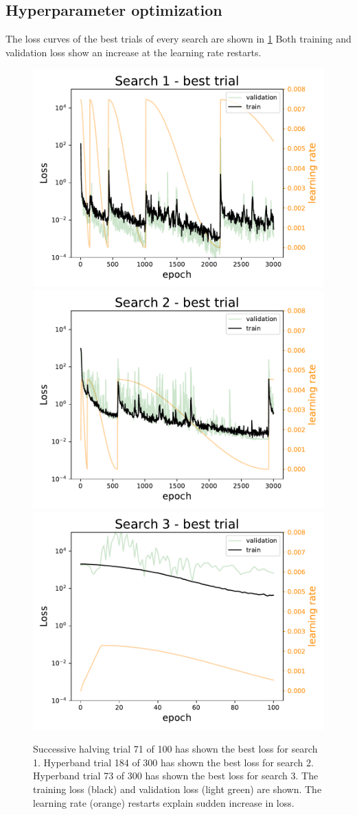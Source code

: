 
\subsection{Hyperparameter optimization}

The loss curves of the best trials of every search are shown in \cref{fig:skinstression-search-best-loss}
Both training and validation loss show an increase at the learning rate restarts.

\begin{figure}
    \centering
    \includegraphics[width=0.33\linewidth]{skinstression/images/hyperparameter-search/search-1/best-trial-loss.pdf}
    \includegraphics[width=0.33\linewidth]{skinstression/images/hyperparameter-search/search-2/best-trial-loss.pdf}
    \includegraphics[width=0.33\linewidth]{skinstression/images/hyperparameter-search/search-3/best-trial-loss.pdf}
    \caption[Hyperparameter search the best losses]{
        Successive halving trial 71 of 100 has shown the best loss for search 1.
        Hyperband trial 184 of 300 has shown the best loss for search 2.
        Hyperband trial 73 of 300 has shown the best loss for search 3.
        The training loss (black) and validation loss (light green) are shown.
        The learning rate (orange) restarts explain sudden increase in loss.
    }
    \label{fig:skinstression-search-best-loss}
\end{figure}

